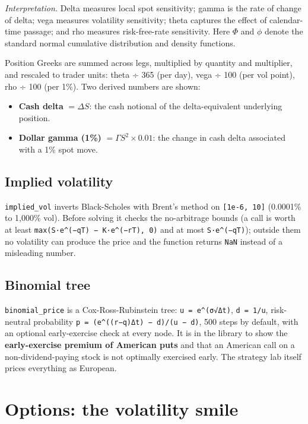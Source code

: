\documentclass[10pt,a4paper]{article}
\providecommand{\tightlist}{\setlength{\itemsep}{1pt}\setlength{\parskip}{0pt}}
\numberwithin{equation}{section}
\begin{document}
\noindent\textit{Interpretation.} Delta measures local spot sensitivity; gamma is the rate of change of delta; vega measures volatility sensitivity; theta captures the effect of calendar-time passage; and rho measures risk-free-rate sensitivity. Here \(\Phi\) and \(\phi\) denote the standard normal cumulative distribution and density functions.

Position Greeks are summed across legs, multiplied by quantity and multiplier, and rescaled to trader units: theta ÷ 365 (per day), vega ÷ 100 (per vol point), rho ÷ 100 (per 1\%). Two derived numbers are shown:

\begin{itemize}
\tightlist
\item
  \textbf{Cash delta} \(=\Delta S\): the cash notional of the delta-equivalent underlying position.
\item
  \textbf{Dollar gamma (1\%)} \(=\Gamma S^2\times0.01\): the change in cash delta associated with a 1\% spot move.
\end{itemize}

\subsection{Implied volatility}\label{implied-volatility}

\texttt{implied\_vol} inverts Black-Scholes with Brent's method on \texttt{{[}1e-6,\ 10{]}} (0.0001\% to 1,000\% vol). Before solving it checks the no-arbitrage bounds (a call is worth at least \texttt{max(S·e\^{}(−qT)\ −\ K·e\^{}(−rT),\ 0)} and at most \texttt{S·e\^{}(−qT)}); outside them no volatility can produce the price and the function returns \texttt{NaN} instead of a misleading number.

\subsection{Binomial tree}\label{binomial-tree}

\texttt{binomial\_price} is a Cox-Ross-Rubinstein tree: \texttt{u\ =\ e\^{}(σ√Δt)}, \texttt{d\ =\ 1/u}, risk-neutral probability \texttt{p\ =\ (e\^{}((r−q)Δt)\ −\ d)/(u\ −\ d)}, 500 steps by default, with an optional early-exercise check at every node. It is in the library to show the \textbf{early-exercise premium of American puts} and that an American call on a non-dividend-paying stock is not optimally exercised early. The strategy lab itself prices everything as European.

\section{Options: the volatility smile}\label{options-the-volatility-smile}
\end{document}

